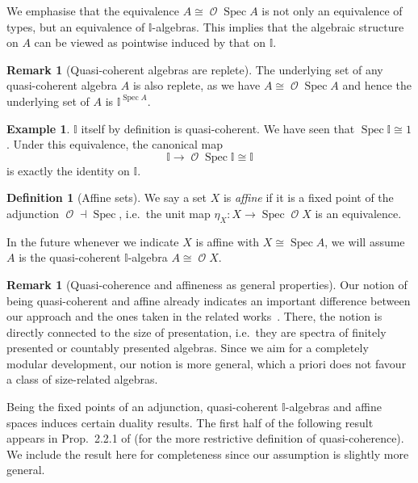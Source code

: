 \documentclass[a4paper,12pt]{amsart}
\theoremstyle{definition}
\newtheorem{example}[theorem]{Example}
\newtheorem{definition}[theorem]{Definition}
\newtheorem{remark}[theorem]{Remark}
\newcommand{\mc}[1]{\mathcal{#1}}
\newcommand{\mbb}[1]{\mathbb{#1}}
\newcommand{\I}{\mbb I}
\newcommand{\spec}{\operatorname{Spec}}
\newcommand{\opens}{\operatorname{\mc{O}}} %
\begin{document}
We emphasise that the equivalence $A \cong \opens{\spec A}$ is not only an equivalence of types, but an equivalence of $\I$-algebras. This implies that the algebraic structure on $A$ can be viewed as pointwise induced by that on $\I$. 

\begin{remark}[Quasi-coherent algebras are replete]\label{rem:qcreplete}
  The underlying set of any quasi-coherent algebra $A$ is also replete, as we have $A\cong \opens{\spec{A}}$ and hence the underlying set of $A$ is $\I^{\spec{A}}$.
\end{remark}

\begin{example}\label{exm:intervalqc}
  $\I$ itself by definition is quasi-coherent. We have seen that $\spec \I \cong 1$. Under this equivalence, the canonical map 
  \[ \I \to \opens{\spec \I} \cong \I \]
  is exactly the identity on $\I$.
\end{example}

\begin{definition}[Affine sets]
  We say a set $X$ is \emph{affine} if it is a fixed point of the adjunction $\opens \dashv \spec$, i.e.\ the unit map $\eta_X\colon X \to \spec\opens X$ is an equivalence.
\end{definition}

In the future whenever we indicate $X$ is affine with $X \cong \spec A$, we will assume $A$ is the quasi-coherent $\I$-algebra $A \cong \opens X$.

\begin{remark}[Quasi-coherence and affineness as general properties]
  Our notion of being quasi-coherent and affine already indicates an important difference between our approach and the ones taken in the related works~\citep{Cherubini_Coquand_Hutzler_2024,cherubini2024foundation}. There, the notion is directly connected to the size of presentation, i.e.\ they are spectra of finitely presented or countably presented algebras. Since we aim for a completely modular development, our notion is more general, which a priori does not favour a class of size-related algebras. 
\end{remark}

Being the fixed points of an adjunction, quasi-coherent $\I$-algebras and affine spaces induces certain duality results. The first half of the following result appears in Prop.~2.2.1 of \citet{Cherubini_Coquand_Hutzler_2024} (for the more restrictive definition of quasi-coherence). We include the result here for completeness since our assumption is slightly more general.
\end{document}
